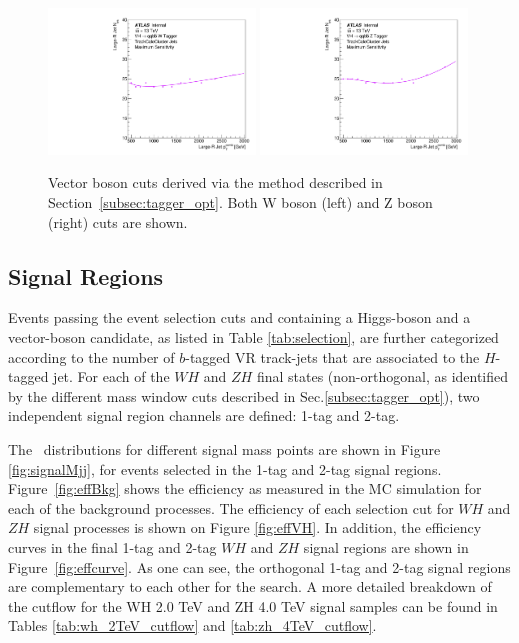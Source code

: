 \begin{figure}[htbp!]
\begin{center}
    \includegraphics[width=0.49\textwidth]{VHqqbbOptimizedBosonTagger_W_ntrk.pdf}
    \includegraphics[width=0.49\textwidth]{VHqqbbOptimizedBosonTagger_Z_ntrk.pdf}
\end{center}
\caption{Vector boson \ntrk cuts derived via the method described in Section~\ref{subsec:tagger_opt}. Both W boson (left) and Z boson (right) cuts are shown.}
\label{fig:wz_tagger_ntrk_cuts}
\end{figure}

\subsection{Signal Regions}
\label{sec:SR}
Events passing the event selection cuts and containing a Higgs-boson and a vector-boson candidate, as listed in Table \ref{tab:selection}, are further categorized according to the number of $b$-tagged VR track-jets that are associated to the $H$-tagged jet.
For each of the $WH$ and $ZH$ final states (non-orthogonal, as identified by the different mass window cuts described in Sec.\ref{subsec:tagger_opt}), two independent signal region channels are defined: 1-tag and 2-tag.

The \mvh\ distributions for different signal mass points are shown in Figure \ref{fig:signalMjj}, for events selected in the 1-tag and 2-tag signal regions.
Figure~\ref{fig:effBkg} shows the efficiency as measured in the MC simulation for each of the background processes.
The efficiency of each selection cut for $WH$ and $ZH$ signal processes is shown on Figure \ref{fig:effVH}.
In addition, the efficiency curves in the final 1-tag and 2-tag $WH$ and $ZH$ signal regions are shown in Figure~\ref{fig:effcurve}.
As one can see, the orthogonal 1-tag and 2-tag signal regions are complementary to each other for the search.
A more detailed breakdown of the cutflow for the WH 2.0 TeV and ZH 4.0 TeV signal samples can be found in Tables \ref{tab:wh_2TeV_cutflow} and \ref{tab:zh_4TeV_cutflow}.

